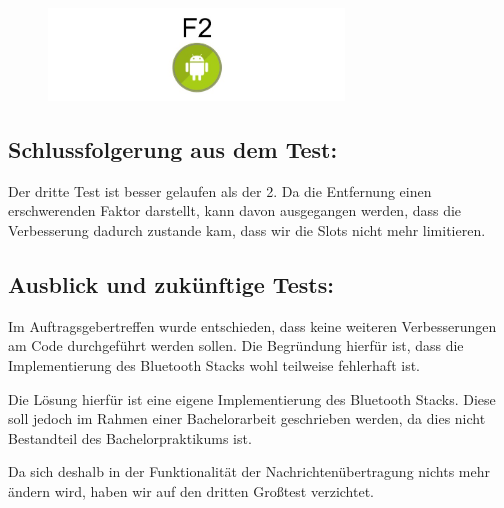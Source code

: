 \begin{figure}[htbp]
\centering
\includegraphics[width=0.7\textwidth]{belege/grosstests/Bilder/Grosstest2/Test3Misserfolg3.jpg}
\caption{}
\end{figure}

\clearpage\subsection{Schlussfolgerung aus dem
Test:}\label{schlussfolgerung-aus-dem-test-4}

Der dritte Test ist besser gelaufen als der 2. Da die Entfernung einen
erschwerenden Faktor darstellt, kann davon ausgegangen werden, dass die
Verbesserung dadurch zustande kam, dass wir die Slots nicht mehr
limitieren.

\clearpage\subsection{Ausblick und zukünftige
Tests:}\label{ausblick-und-zukuxfcnftige-tests}

Im Auftragsgebertreffen wurde entschieden, dass keine weiteren
Verbesserungen am Code durchgeführt werden sollen. Die Begründung
hierfür ist, dass die Implementierung des Bluetooth Stacks wohl
teilweise fehlerhaft ist.

Die Lösung hierfür ist eine eigene Implementierung des Bluetooth Stacks.
Diese soll jedoch im Rahmen einer Bachelorarbeit geschrieben werden, da
dies nicht Bestandteil des Bachelorpraktikums ist.

Da sich deshalb in der Funktionalität der Nachrichtenübertragung nichts
mehr ändern wird, haben wir auf den dritten Großtest verzichtet.
